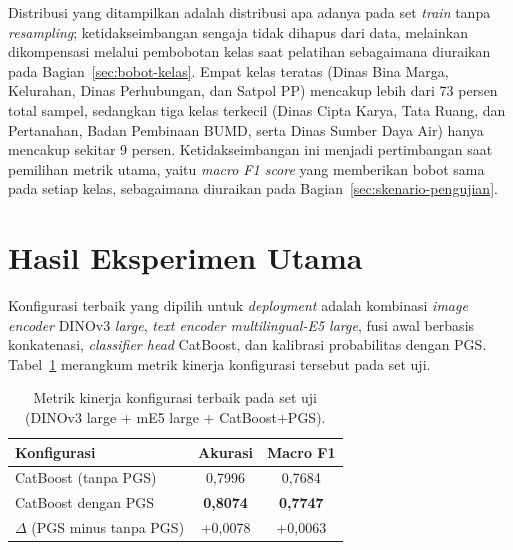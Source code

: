 Distribusi yang ditampilkan adalah distribusi apa adanya pada set \textit{train} tanpa \textit{resampling}; ketidakseimbangan sengaja tidak dihapus dari data, melainkan dikompensasi melalui pembobotan kelas saat pelatihan sebagaimana diuraikan pada Bagian~\ref{sec:bobot-kelas}. Empat kelas teratas (Dinas Bina Marga, Kelurahan, Dinas Perhubungan, dan Satpol PP) mencakup lebih dari 73 persen total sampel, sedangkan tiga kelas terkecil (Dinas Cipta Karya, Tata Ruang, dan Pertanahan, Badan Pembinaan BUMD, serta Dinas Sumber Daya Air) hanya mencakup sekitar 9 persen. Ketidakseimbangan ini menjadi pertimbangan saat pemilihan metrik utama, yaitu \textit{macro F1 score} yang memberikan bobot sama pada setiap kelas, sebagaimana diuraikan pada Bagian~\ref{sec:skenario-pengujian}.

\section{Hasil Eksperimen Utama}
\label{sec:hasil-utama}

Konfigurasi terbaik yang dipilih untuk \textit{deployment} adalah kombinasi \textit{image encoder} DINOv3 \textit{large}, \textit{text encoder multilingual-E5 large}, fusi awal berbasis konkatenasi, \textit{classifier head} CatBoost, dan kalibrasi probabilitas dengan PGS. Tabel~\ref{tab:hasil-utama} merangkum metrik kinerja konfigurasi tersebut pada set uji.

\begin{table}[htbp]
\centering
\caption{Metrik kinerja konfigurasi terbaik pada set uji (DINOv3 large + mE5 large + CatBoost+PGS).}
\label{tab:hasil-utama}
\begin{tabular}{l c c}
\toprule
\textbf{Konfigurasi} & \textbf{Akurasi} & \textbf{Macro F1} \\
\midrule
CatBoost (tanpa PGS) & 0,7996 & 0,7684 \\
CatBoost dengan PGS & \textbf{0,8074} & \textbf{0,7747} \\
$\Delta$ (PGS minus tanpa PGS) & +0,0078 & +0,0063 \\
\bottomrule
\end{tabular}
\end{table}

